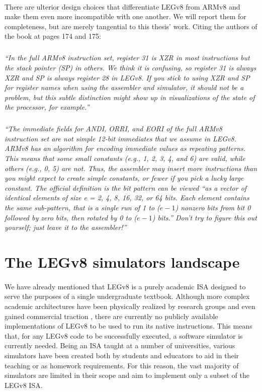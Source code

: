 \paragraph{}
There are ulterior design choices that differentiate LEGv8 from ARMv8 and make them even more incompatible with one another.  We will report them for completeness, but are merely tangential to this thesis' work. Citing the authors of the book \cite{patterson2016computer} at pages 174 and 175:
\subparagraph{}
\emph{
``In the full ARMv8 instruction set, register 31 is XZR in most instructions
but the stack pointer (SP) in others. We think it is confusing, so register 31 is
always XZR and SP is always register 28 in LEGv8. If you stick to using XZR
and SP for register names when using the assembler and simulator, it should
not be a problem, but this subtle distinction might show up in visualizations
of the state of the processor, for example.''}
\subparagraph{}
\emph{
``The immediate fields for ANDI, ORRI, and EORI of the full ARMv8
instruction set are not simple 12-bit immediates that we assume in LEGv8.
ARMv8 has an algorithm for encoding immediate values as repeating
patterns. This means that some small constants (e.g., 1, 2, 3, 4, and 6) are
valid, while others (e.g., 0, 5) are not. Thus, the assembler may insert more
instructions than you might expect to create simple constants, or fewer if
you pick a lucky large constant. The official definition is the bit pattern can
be viewed “as a vector of identical elements of size e = 2, 4, 8, 16, 32, or 64
bits. Each element contains the same sub-pattern, that is a single run of 1
to ($e - 1$) nonzero bits from bit 0 followed by zero bits, then rotated by 0 to
($e - 1$) bits.” Don’t try to figure this out yourself; just leave it to the assembler!''}

\section{The LEGv8 simulators landscape}

\paragraph{}
We have already mentioned that LEGv8 is a purely academic ISA designed to serve the purposes of a single undergraduate textbook. Although more complex academic architectures have been physically realized by research groups and even gained commercial traction \cite{riscvweb}, there are currently no publicly available implementations of LEGv8 to be used to run its native instructions. This means that, for any LEGv8 code to be successfully executed, a software simulator is currently needed. Being an ISA taught at a number of universities, various simulators have been created both by students and educators to aid in their teaching or as homework requirements. For this reason, the vast majority of simulators are limited in their scope and aim to implement only a subset of the LEGv8 ISA.

